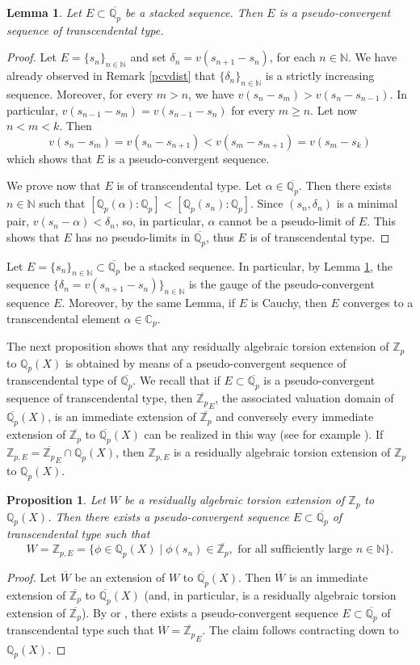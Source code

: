 \documentclass[10pt]{article}
\numberwithin{equation}{section}
\newtheorem{Prop}[equation]{Proposition}
\newtheorem{Lem}[equation]{Lemma}
\theoremstyle{definition}\newtheorem{Def}[equation]{Definition}
\theoremstyle{definition}\newtheorem{Ques}[equation]{Question}
\newcommand{\Q}{\mathbb{Q}}
\newcommand{\N}{\mathbb{N}}
\newcommand{\Z}{\mathbb{Z}}
\newcommand{\C}{\mathbb{C}}
\newcommand{\oQp}{\overline{\Q_p}}
\newcommand{\oZp}{\overline{\Z_p}}
\begin{document}
\begin{Lem}\label{distinguishedpcv}
Let $E\subset\oQp$ be a stacked sequence. Then $E$ is a pseudo-convergent sequence of transcendental type.
\end{Lem}
\begin{proof} Let $E=\{s_n\}_{n\in\N}$ and set $\delta_n=v(s_{n+1}-s_n)$, for each $n\in\N$. We have already observed in Remark \ref{pcvdist} that $\{\delta_n\}_{n\in\N}$ is a strictly increasing sequence. Moreover, for every $m>n$, we have $v(s_n-s_m)>v(s_n-s_{n-1})$. In particular, $v(s_{n-1}-s_m)=v(s_{n-1}-s_n)$ for every $m\geq n$. Let now $n<m<k$. Then
$$v(s_n-s_m)=v(s_n-s_{n+1})<v(s_m-s_{m+1})=v(s_m-s_k)$$
which shows that $E$ is a pseudo-convergent sequence.

We prove now that $E$ is of transcendental type. Let $\alpha\in\oQp$. Then there exists $n\in\N$ such that $[\Q_p(\alpha):\Q_p]<[\Q_p(s_n):\Q_p]$. Since $(s_n,\delta_n)$ is a minimal pair, $v(s_n-\alpha)<\delta_{n}$, so, in particular, $\alpha$ cannot be a pseudo-limit of $E$. This shows that $E$ has no pseudo-limits in $\oQp$, thus $E$ is of transcendental type.
\end{proof}

Let $E=\{s_n\}_{n\in\N}\subset\oQp$ be a stacked sequence. In particular, by Lemma \ref{distinguishedpcv}, the sequence $\{\delta_n=v(s_{n+1}-s_n)\}_{n\in\N}$ is the gauge of the pseudo-convergent sequence $E$. Moreover, by the same Lemma, if $E$ is Cauchy, then $E$ converges to a transcendental element $\alpha\in\C_p$. 

The next proposition shows that any residually algebraic torsion extension of $\Z_p$ to $\Q_p(X)$ is obtained by means of a pseudo-convergent sequence of transcendental type of $\oQp$. We recall that if $E\subset\oQp$ is a pseudo-convergent sequence of transcendental type, then $\oZp_E$, the associated valuation domain of $\oQp(X)$, is   an immediate extension of $\oZp$ and conversely every immediate extension of $\oZp$ to $\oQp(X)$ can be realized in this way (see for example \cite{Kap, PS2}). If $\Z_{p,E}=\oZp_E\cap\Q_p(X)$, then $\Z_{p,E}$ is a residually algebraic torsion extension of $\Z_p$ to $\Q_p(X)$. 



\begin{Prop}\label{ratpcvtransc}
Let $W$ be a residually algebraic torsion extension of $\Z_p$ to $\Q_p(X)$. Then there exists a pseudo-convergent sequence $E\subset\oQp$ of transcendental type such that 
$$W=\Z_{p,E}=\{\phi\in\Q_p(X)\mid \phi(s_n)\in \oZp,\text{ for all sufficiently large }n\in\N\}.$$
\end{Prop}
\begin{proof}
Let $\overline{W}$ be an extension of $W$ to $\oQp(X)$. Then $\overline{W}$ is an immediate extension of $\oZp$ to $\oQp(X)$ (and, in particular, is a residually algebraic torsion extension of $\oZp$). By \cite[Theorems 1 \& 2]{Kap} or \cite[Theorem 6.2, a)]{PS2}, there exists a pseudo-convergent sequence $E\subset\oQp$ of transcendental type such that $\overline{W}=\oZp_E$. The claim follows contracting down to $\Q_p(X)$.
\end{proof}
\end{document}
